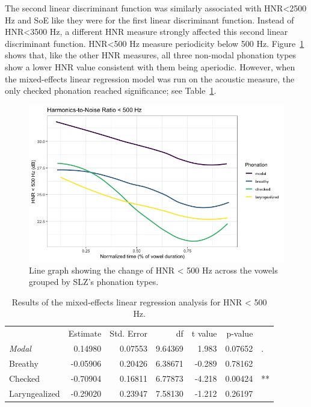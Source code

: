 \documentclass[12pt, letterpaper]{article}
\providecommand{\lsptoprule}{\midrule\toprule}
\providecommand{\lspbottomrule}{\bottomrule\midrule}
\begin{document}
The second linear discriminant function was similarly associated with HNR\textless 2500 Hz and SoE like they were for the first linear discriminant function. Instead of HNR\textless 3500 Hz, a different HNR measure strongly affected this second linear discriminant function. HNR\textless 500 Hz measure periodicity below 500 Hz. Figure~\ref{fig:HNR05} shows that, like the other HNR measures, all three non-modal phonation types show a lower HNR value consistent with them being aperiodic. However, when the mixed-effects linear regression model was run on the acoustic measure, the only checked phonation reached significance; see Table~\ref{tab:HNR05}. 

\begin{figure}[!h]
	\centering
	\includegraphics[width=.75\linewidth]{Images/HNR05.png}
	\caption{Line graph showing the change of HNR < 500 Hz across the vowels grouped by SLZ's phonation types.}
	\label{fig:HNR05}
\end{figure}

\begin{table}[!h]
    \centering
    \caption{Results of the mixed-effects linear regression analysis for HNR < 500 Hz.}
    \label{tab:HNR05}
    \begin{tabular}{lrrrrrl}
	\lsptoprule
					&  Estimate  & Std. Error & df & t value & p-value & \\
        \textit{Modal}  &  0.14980  & 0.07553 & 9.64369 &  1.983 & 0.07652 & . \\  
  	Breathy   		&  -0.05906 & 0.20426 & 6.38671 & -0.289 & 0.78162 &  \\
	Checked    		&  -0.70904 & 0.16811 & 6.77873 & -4.218 & 0.00424 & ** \\
	Laryngealized	&  -0.29020 & 0.23947 & 7.58130 & -1.212 & 0.26197 & \\
    \lspbottomrule
    \end{tabular}
\end{table}
\end{document}
